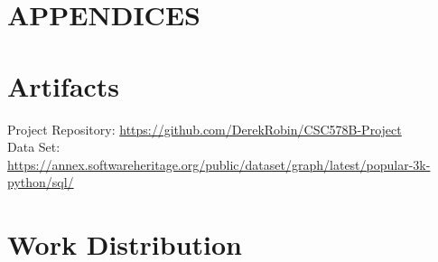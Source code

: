 \documentclass[acmconf]{acmart}
\begin{document}



\appendix
\section*{APPENDICES}
\section{Artifacts} \label{artifacts}

Project Repository: \url{https://github.com/DerekRobin/CSC578B-Project}\\
Data Set: \url{https://annex.softwareheritage.org/public/dataset/graph/latest/popular-3k-python/sql/}

\section{Work Distribution}
\end{document}
